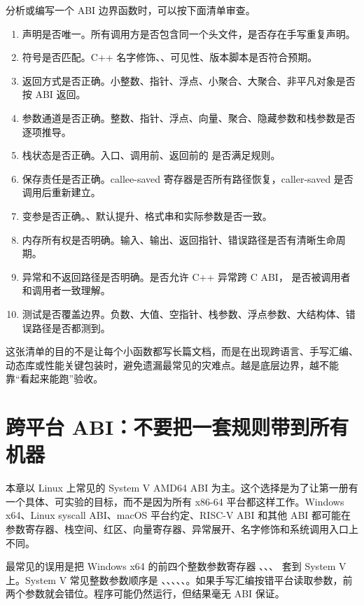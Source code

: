 分析或编写一个 ABI 边界函数时，可以按下面清单审查。

\begin{enumerate}
  \item 声明是否唯一。所有调用方是否包含同一个头文件，是否存在手写重复声明。
  \item 符号是否匹配。C++ 名字修饰、、可见性、版本脚本是否符合预期。
  \item 返回方式是否正确。小整数、指针、浮点、小聚合、大聚合、非平凡对象是否按 ABI 返回。
  \item 参数通道是否正确。整数、指针、浮点、向量、聚合、隐藏参数和栈参数是否逐项推导。
  \item 栈状态是否正确。入口、调用前、返回前的  是否满足规则。
  \item 保存责任是否正确。callee-saved 寄存器是否所有路径恢复，caller-saved 是否调用后重新建立。
  \item 变参是否正确。、默认提升、格式串和实际参数是否一致。
  \item 内存所有权是否明确。输入、输出、返回指针、错误路径是否有清晰生命周期。
  \item 异常和不返回路径是否明确。是否允许 C++ 异常跨 C ABI，\code{[[noreturn]]} 是否被调用者和调用者一致理解。
  \item 测试是否覆盖边界。负数、大值、空指针、栈参数、浮点参数、大结构体、错误路径是否都测到。
\end{enumerate}

这张清单的目的不是让每个小函数都写长篇文档，而是在出现跨语言、手写汇编、动态库或性能关键包装时，避免遗漏最常见的灾难点。越是底层边界，越不能靠“看起来能跑”验收。

\section{跨平台 ABI：不要把一套规则带到所有机器}

本章以 Linux 上常见的 System V AMD64 ABI 为主。这个选择是为了让第一册有一个具体、可实验的目标，而不是因为所有 x86-64 平台都这样工作。Windows x64、Linux syscall ABI、macOS 平台约定、RISC-V ABI 和其他 ABI 都可能在参数寄存器、栈空间、红区、向量寄存器、异常展开、名字修饰和系统调用入口上不同。

最常见的误用是把 Windows x64 的前四个整数参数寄存器 、、、 套到 System V 上。System V 常见整数参数顺序是 、、、、、。如果手写汇编按错平台读取参数，前两个参数就会错位。程序可能仍然运行，但结果毫无 ABI 保证。

